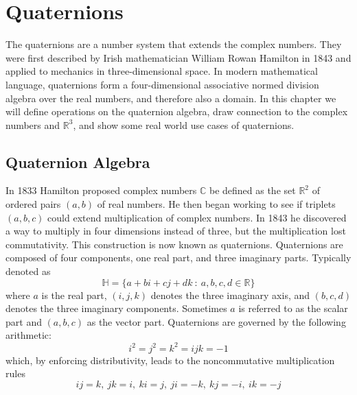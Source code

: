 \chapter{Quaternions}
The quaternions are a number system that extends the complex numbers. 
They were first described by Irish mathematician William Rowan Hamilton in 1843 and applied to mechanics in three-dimensional space. 
In modern mathematical language, quaternions form a four-dimensional associative normed division algebra over the real numbers, and therefore also a domain.
In this chapter we will define operations on the quaternion algebra, draw connection to the complex numbers and $\mathbb{R}^3$, and show some real world use cases of quaternions.


\section{Quaternion Algebra}\label{s:quatalg}
In 1833 Hamilton proposed complex numbers $\mathbb{C}$ be defined as the set $\mathbb{R}^2$ of ordered pairs $(a, b)$ of real numbers.
He then began working to see if triplets $(a,b,c)$ could extend multiplication of complex numbers.
In 1843 he discovered a way to multiply in four dimensions instead of three, but the multiplication lost commutativity.
This construction is now known as quaternions.
Quaternions are composed of four components, one real part, and three imaginary parts.
Typically denoted as
\begin{equation}
\mathbb{H} = \{a + b\textit{i} + c\textit{j} + d\textit{k}~:~a,b,c,d \in \mathbb{R}\}
\label{eq:quaternion1}
\end{equation}
where $a$ is the real part, $(i,j,k)$ denotes the three imaginary axis, and $(b,c,d)$ denotes the three imaginary components.
Sometimes $a$ is referred to as the scalar part and $(a,b,c)$ as the vector part.
Quaternions are governed by the following arithmetic:
\begin{equation}
i^2=j^2=k^2=ijk=-1
\label{eq:quarternion2}
\end{equation}
which, by enforcing distributivity, leads to the noncommutative multiplication rules
\begin{equation}
ij=k,~jk=i,~ki=j,~ji=-k,~kj=-i,~ik=-j
\label{eq:quarternion3}
\end{equation}


